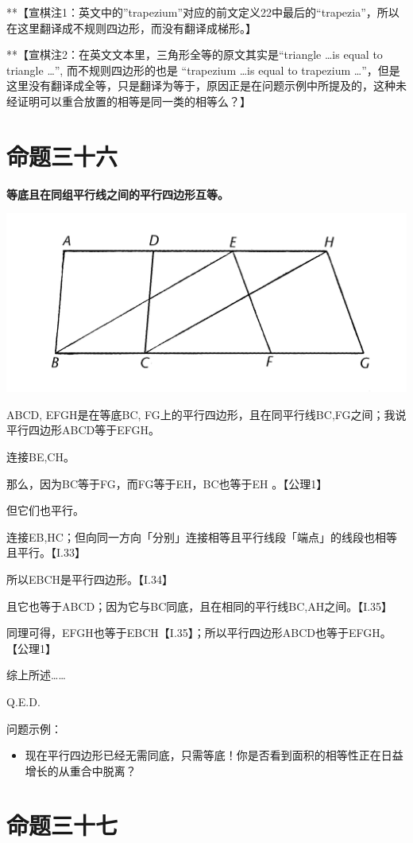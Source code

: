 \documentclass[
]{book}
\providecommand{\tightlist}{%
  \setlength{\itemsep}{0pt}\setlength{\parskip}{0pt}}
\begin{document}
**【宣棋注1：英文中的''trapezium''对应的前文定义22中最后的``trapezia''，所以在这里翻译成不规则四边形，而没有翻译成梯形。】

**【宣棋注2：在英文文本里，三角形全等的原文其实是``triangle \ldots is equal to triangle \ldots'', 而不规则四边形的也是 ``trapezium \ldots is equal to trapezium \ldots{}''，但是这里没有翻译成全等，只是翻译为等于，原因正是在问题示例中所提及的，这种未经证明可以重合放置的相等是同一类的相等么？】

\hypertarget{ux547dux9898ux4e09ux5341ux516d}{%
\section{命题三十六}\label{ux547dux9898ux4e09ux5341ux516d}}

\textbf{等底且在同组平行线之间的平行四边形互等。}

\includegraphics[width=0.5\linewidth]{./image/img530}

ABCD, EFGH是在等底BC, FG上的平行四边形，且在同平行线BC,FG之间；我说平行四边形ABCD等于EFGH。

连接BE,CH。

那么，因为BC等于FG，而FG等于EH，BC也等于EH 。【公理1】

但它们也平行。

连接EB,HC；但向同一方向「分别」连接相等且平行线段「端点」的线段也相等且平行。【I.33】

所以EBCH是平行四边形。【I.34】

且它也等于ABCD；因为它与BC同底，且在相同的平行线BC,AH之间。【I.35】

同理可得，EFGH也等于EBCH【I.35】；所以平行四边形ABCD也等于EFGH。【公理1】

综上所述\ldots\ldots{}

Q.E.D.

问题示例：

\begin{itemize}
\tightlist
\item
  现在平行四边形已经无需同底，只需等底！你是否看到面积的相等性正在日益增长的从重合中脱离？
\end{itemize}

\hypertarget{ux547dux9898ux4e09ux5341ux4e03}{%
\section{命题三十七}\label{ux547dux9898ux4e09ux5341ux4e03}}
\end{document}
